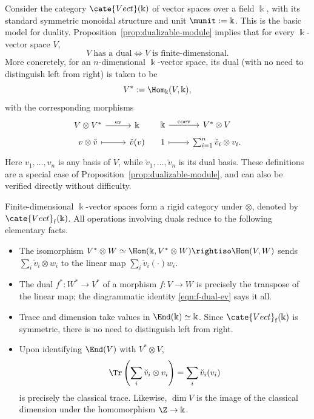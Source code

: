 \begin{example}\label{eg:Vect-trace}
	Consider the category $\cate{Vect}(\Bbbk)$ of vector spaces over a field
	$\Bbbk$, with its standard symmetric monoidal structure and unit
	$\munit:=\Bbbk$. This is the basic model for duality.
	Proposition~\ref{prop:dualizable-module} implies that for every
	$\Bbbk$-vector space $V$,
	\[ V \;\text{has a dual} \iff V \;\text{is finite-dimensional}. \]
	More concretely, for an $n$-dimensional $\Bbbk$-vector space, its dual
	(with no need to distinguish left from right) is taken to be
	\[ V^* := \Hom_{\Bbbk}(V, \Bbbk), \]
	with the corresponding morphisms
	\[\begin{tikzcd}[row sep=tiny]
		V \otimes V^* \arrow[r, "{\mathrm{ev}}"] & \Bbbk \\
		v \otimes \check{v} \arrow[mapsto, r] & \check{v}(v)
	\end{tikzcd} \quad \begin{tikzcd}[row sep=tiny]
		\Bbbk \arrow[r, "{\mathrm{coev}}"] & V^* \otimes V \\
		1 \arrow[mapsto, r] & \sum_{i=1}^n \check{v}_i \otimes v_i.
	\end{tikzcd} \]
	Here $v_1,\ldots,v_n$ is any basis of $V$, while
	$\check v_1,\ldots,\check v_n$ is its dual basis. These definitions are a
	special case of Proposition~\ref{prop:dualizable-module}, and can also be
	verified directly without difficulty.

	Finite-dimensional $\Bbbk$-vector spaces form a rigid category under
	$\otimes$, denoted by $\cate{Vect}_{\mathrm f}(\Bbbk)$. All operations
	involving duals reduce to the following elementary facts.
	\begin{itemize}
		\item The isomorphism
		$V^*\otimes W\simeq\Hom(\Bbbk,V^*\otimes W)\rightiso\Hom(V,W)$
		sends $\sum_i\check v_i\otimes w_i$ to the linear map
		$\sum_i\check v_i(\mathord\cdot)w_i$.
		\item The dual $f^*:W^*\to V^*$ of a morphism $f:V\to W$ is precisely
		the transpose of the linear map; the diagrammatic identity
		\eqref{eqn:f-dual-ev} says it all.
		\item Trace and dimension take values in
		$\End(\Bbbk)\simeq\Bbbk$. Since
		$\cate{Vect}_{\mathrm f}(\Bbbk)$ is symmetric, there is no need to
		distinguish left from right.
		\item Upon identifying $\End(V)$ with $V^*\otimes V$,
		\[ \Tr\left(\sum_i\check v_i\otimes v_i\right)=
		\sum_i\check v_i(v_i) \]
		is precisely the classical trace. Likewise, $\dim V$ is the image of
		the classical dimension under the homomorphism $\Z\to\Bbbk$.
	\end{itemize}
\end{example}

